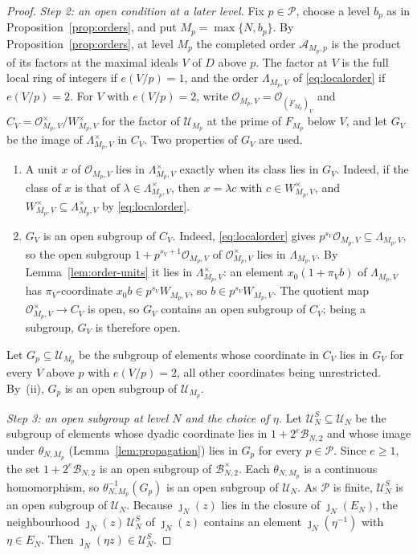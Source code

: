 \documentclass[11pt]{article}
\theoremstyle{plain}
\theoremstyle{definition}
\theoremstyle{remark}
\newcommand{\OO}{\mathcal O}
\begin{document}
\begin{proof}
\emph{Step 2: an open condition at a later level.}  Fix $p\in\mathcal P$,
choose a level $b_p$ as in Proposition~\ref{prop:orders}, and put
$M_p=\max\{N,b_p\}$.  By Proposition~\ref{prop:orders}, at level $M_p$ the
completed order $\mathcal A_{M_p,p}$ is the product of its factors at the
maximal ideals $V$ of $D$ above $p$.  The factor at $V$ is the full local
ring of integers if $e(V/p)=1$, and the order $\Lambda_{M_p,V}$ of
\eqref{eq:localorder} if $e(V/p)=2$.  For $V$ with $e(V/p)=2$, write $\OO_{M_p,V}=\OO_{(F_{M_p})_V}$ and
$C_V=\OO_{M_p,V}^\times/W_{M_p,V}^\times$ for the factor of
$\mathcal U_{M_p}$ at the prime of $F_{M_p}$ below $V$, and let $G_V$ be
the image of $\Lambda_{M_p,V}^\times$ in $C_V$.  Two properties of $G_V$
are used.
\begin{enumerate}
\item[(i)] A unit $x$ of $\OO_{M_p,V}$ lies in $\Lambda_{M_p,V}^\times$
exactly when its class lies in $G_V$.  Indeed, if the class of $x$ is that
of $\lambda\in\Lambda_{M_p,V}^\times$, then $x=\lambda c$ with
$c\in W_{M_p,V}^\times$, and $W_{M_p,V}^\times\subseteq
\Lambda_{M_p,V}^\times$ by \eqref{eq:localorder}.
\item[(ii)] $G_V$ is an open subgroup of $C_V$.  Indeed,
\eqref{eq:localorder} gives $p^{s_V}\OO_{M_p,V}\subseteq\Lambda_{M_p,V}$,
so the open subgroup $1+p^{s_V+1}\OO_{M_p,V}$ of $\OO_{M_p,V}^\times$ lies
in $\Lambda_{M_p,V}$.  By Lemma~\ref{lem:order-units} it lies in
$\Lambda_{M_p,V}^\times$: an element $x_0(1+\pi_Vb)$ of $\Lambda_{M_p,V}$
has $\pi_V$-coordinate $x_0b\in p^{s_V}W_{M_p,V}$, so
$b\in p^{s_V}W_{M_p,V}$.  The quotient map
$\OO_{M_p,V}^\times\to C_V$ is open, so $G_V$ contains an open subgroup
of $C_V$; being a subgroup, $G_V$ is therefore open.
\end{enumerate}
Let $G_p\subseteq\mathcal U_{M_p}$ be the subgroup of elements whose
coordinate in $C_V$ lies in $G_V$ for every $V$ above $p$ with
$e(V/p)=2$, all other coordinates being unrestricted.  By~(ii), $G_p$ is
an open subgroup of $\mathcal U_{M_p}$.

\emph{Step 3: an open subgroup at level $N$ and the choice of $\eta$.}
Let $\mathcal U_N^S\subseteq\mathcal U_N$ be the subgroup of elements whose
dyadic coordinate lies in $1+2^e\mathcal B_{N,2}$ and whose image under
$\theta_{N,M_p}$ (Lemma~\ref{lem:propagation}) lies in $G_p$ for every
$p\in\mathcal P$.  Since $e\ge1$, the set $1+2^e\mathcal B_{N,2}$ is an
open subgroup of $\mathcal B_{N,2}^\times$.  Each $\theta_{N,M_p}$ is a
continuous homomorphism, so $\theta_{N,M_p}^{-1}(G_p)$ is an open subgroup
of $\mathcal U_N$.  As $\mathcal P$ is finite, $\mathcal U_N^S$ is an open
subgroup of $\mathcal U_N$.  Because $\jmath_N(z)$ lies in the closure of
$\jmath_N(E_N)$, the neighbourhood $\jmath_N(z)\,\mathcal U_N^S$ of
$\jmath_N(z)$ contains an element $\jmath_N(\eta^{-1})$ with
$\eta\in E_N$.  Then $\jmath_N(\eta z)\in\mathcal U_N^S$.


\end{proof}
\end{document}
